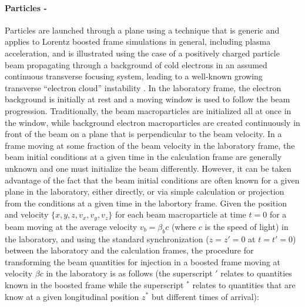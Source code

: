 \documentclass[]{report}
\begin{document}
\paragraph{Particles - }
Particles are launched through a plane using a technique that is generic and applies to Lorentz boosted frame simulations in general, including plasma acceleration, and is illustrated using the case of a positively charged particle beam propagating through a background of cold electrons in an assumed continuous transverse focusing system, leading to a well-known growing transverse ``electron cloud'' instability  \cite{VayPRL07}. In the laboratory frame, the electron background is initially at rest and a moving window is used to follow the beam progression. Traditionally, the beam macroparticles are initialized all at once in the window, while background electron macroparticles are created continuously in front of the beam on a plane that is perpendicular to the beam velocity. In a frame moving at some fraction of the beam velocity in the laboratory frame, the beam initial conditions at a given time in the calculation frame are generally unknown and one must initialize the beam differently. However, it can be taken advantage of the fact that the beam initial conditions are often known for a given plane in the laboratory, either directly, or via simple calculation or projection from the conditions at a given time in the labortory frame. Given the position and velocity $\{x,y,z,v_x,v_y,v_z\}$ for each beam macroparticle at time $t=0$ for a beam moving at the average velocity $v_b=\beta_b c$ (where $c$ is the speed of light) in the laboratory, and using the standard synchronization ($z=z'=0$ at $t=t'=0$) between the laboratory and the calculation frames, the procedure for transforming the beam quantities for injection in a boosted frame moving at velocity $\beta c$ in the laboratory is as follows (the superscript $'$ relates to quantities known in the boosted frame while the superscript $^*$ relates to quantities that are know at a given longitudinal position $z^*$ but different times of arrival):
\end{document}
